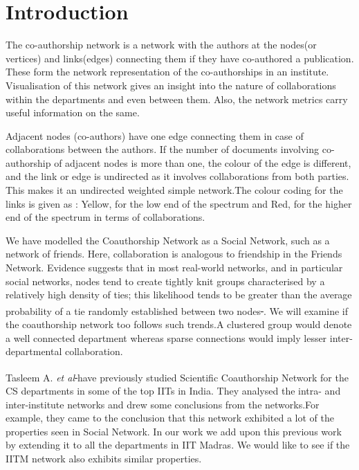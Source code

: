 \documentclass[conference,compsoc]{IEEEtran}
\begin{document}




%
\IEEEpeerreviewmaketitle


\section{Introduction}
The co-authorship network is a network with the authors at the nodes(or vertices) and links(edges) connecting them if they have co-authored a publication. These form the network representation of the co-authorships in an institute. Visualisation of this network gives an insight into the nature of collaborations within the departments and even between them. Also, the network metrics carry useful information on the same.

Adjacent nodes (co-authors) have one edge connecting them in case of collaborations between the authors. If the number of documents involving co-authorship of adjacent nodes is more than one, the colour of the edge is different, and the link or edge is undirected as it involves collaborations from both parties. This makes it an undirected weighted simple network.The colour coding for the links is given as : Yellow, for the low end of the spectrum and Red, for the higher end of the spectrum in terms of collaborations.

 
We have modelled the Coauthorship Network as a Social Network, such as a network of friends. Here, collaboration is analogous to friendship in the Friends Network. Evidence suggests that in most real-world networks, and in particular social networks, nodes tend to create tightly knit groups characterised by a relatively high density of ties; this likelihood tends to be greater than the average probability of a tie randomly established between two nodes\textsuperscript{\hyperref[sec:thebibliography]{ \cite{holland} \cite{watts} }}. We will examine if the coauthorship network too follows such trends.A clustered group would denote a well connected department whereas sparse connections would imply lesser inter-departmental collaboration. 

Tasleem A. \emph{et al}\textsuperscript{\hyperref[sec:thebibliography]{ \cite{tasleem} } } have previously studied Scientific Coauthorship Network for the CS departments in some of the top IITs in India. They analysed the intra- and inter-institute networks and drew some conclusions from the networks.For example, they came to the conclusion that this network exhibited a lot of the properties seen in Social Network.  In our work we add upon this previous work by extending it to all the departments in IIT Madras. We would like to see if the IITM network also exhibits similar properties.
\end{document}
